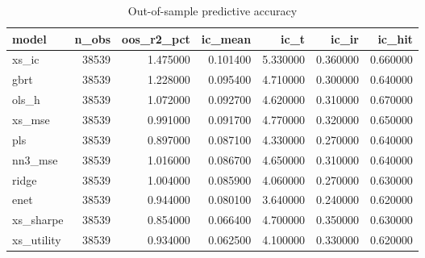 \begin{table}
\caption{Out-of-sample predictive accuracy}
\label{tab:t1_statistical}
\begin{tabular}{lrrrrrr}
\toprule
model & n\_obs & oos\_r2\_pct & ic\_mean & ic\_t & ic\_ir & ic\_hit \\
\midrule
xs\_ic & 38539 & 1.475000 & 0.101400 & 5.330000 & 0.360000 & 0.660000 \\
gbrt & 38539 & 1.228000 & 0.095400 & 4.710000 & 0.300000 & 0.640000 \\
ols\_h & 38539 & 1.072000 & 0.092700 & 4.620000 & 0.310000 & 0.670000 \\
xs\_mse & 38539 & 0.991000 & 0.091700 & 4.770000 & 0.320000 & 0.650000 \\
pls & 38539 & 0.897000 & 0.087100 & 4.330000 & 0.270000 & 0.640000 \\
nn3\_mse & 38539 & 1.016000 & 0.086700 & 4.650000 & 0.310000 & 0.640000 \\
ridge & 38539 & 1.004000 & 0.085900 & 4.060000 & 0.270000 & 0.630000 \\
enet & 38539 & 0.944000 & 0.080100 & 3.640000 & 0.240000 & 0.620000 \\
xs\_sharpe & 38539 & 0.854000 & 0.066400 & 4.700000 & 0.350000 & 0.630000 \\
xs\_utility & 38539 & 0.934000 & 0.062500 & 4.100000 & 0.330000 & 0.620000 \\
\bottomrule
\end{tabular}
\end{table}
